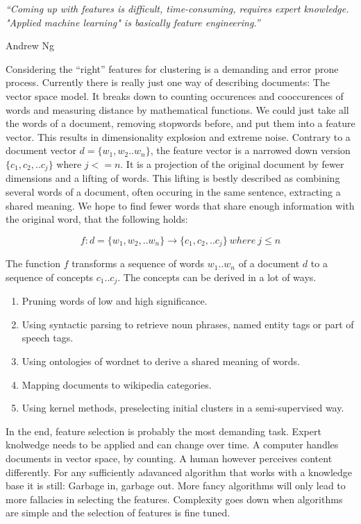 \epigraph{\emph{
  ``Coming up with features is difficult, time-consuming, requires expert knowledge. "Applied machine learning" is basically feature engineering.''
}}{ Andrew Ng }

Considering the ``right'' features for clustering is a demanding and error prone process. Currently there is really just one way of describing documents: The vector space model. It breaks down to counting occurences and cooccurences of words and measuring distance by mathematical functions. We could just take all the words of a document, removing stopwords before, and put them into a feature vector. This results in dimensionality explosion and extreme noise. Contrary to a document vector $d = \{w_1,w_2..w_n\}$, the feature vector is a narrowed down version $\{c_1,c_2,..c_j\}$ where $j <= n$. It is a projection of the original document by fewer dimensions and a lifting of words. This lifting is bestly described as combining several words of a document, often occuring in the same sentence, extracting a shared meaning. We hope to find fewer words that share enough information with the original word, that the following holds:
  
  \begin{equation}
    f : d=\{w_1,w_2,..w_n\} \to \{c_1,c_2,..c_j\}\:where\:j \leq n
  \end{equation}

The function $f$ transforms a sequence of words $w_1..w_n$ of a document $d$ to a sequence of concepts $c_1..c_j$. The concepts can be derived in a lot of ways.

  \begin{enumerate}
    \item Pruning words of low and high significance.
    \item Using syntactic parsing to retrieve noun phrases, named entity tags or part of speech tags.
    \item Using ontologies of wordnet to derive a shared meaning of words.
    \item Mapping documents to wikipedia categories.
    \item Using kernel methods, preselecting initial clusters in a semi-supervised way.
  \end{enumerate}

In the end, feature selection is probably the most demanding task. Expert knolwedge needs to be applied and can change over time. A computer handles documents in vector space, by counting. A human however perceives content differently. For any sufficiently adavanced algorithm that works with a knowledge base it is still: Garbage in, garbage out. More fancy algorithms will only lead to more fallacies in selecting the features. Complexity goes down when algorithms are simple and the selection of features is fine tuned.\\

